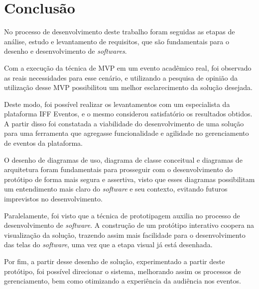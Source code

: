 \chapter{Conclusão}

No processo de desenvolvimento deste trabalho foram seguidas as etapas de análise, estudo e levantamento de requisitos, que são fundamentais para o desenho e desenvolvimento de \textit{softwares}.

Com a execução da técnica de MVP em um evento acadêmico real, foi observado as reais necessidades para esse cenário, e utilizando a pesquisa de opinião da utilização desse MVP possibilitou um melhor esclarecimento da solução desejada.

Deste modo, foi possível realizar os levantamentos com um especialista da plataforma IFF Eventos, e o mesmo considerou satisfatório os resultados obtidos. A partir disso foi constatada a viabilidade do desenvolvimento de uma solução para uma ferramenta que agregasse funcionalidade e agilidade no gerenciamento de eventos da plataforma.

O desenho de diagramas de uso, diagrama de classe conceitual e diagramas de arquitetura foram fundamentais para prosseguir com o desenvolvimento do protótipo de forma mais segura e assertiva, visto que esses diagramas possibilitam um entendimento mais claro do \textit{software} e seu contexto, evitando futuros imprevistos no desenvolvimento.

Paralelamente, foi visto que a técnica de prototipagem auxilia no processo de desenvolvimento de \textit{software}. A construção de um protótipo interativo coopera na visualização da solução, trazendo assim mais facilidade para o desenvolvimento das telas do \textit{software}, uma vez que a etapa visual já está desenhada. 

Por fim, a partir desse desenho de solução, experimentado a partir deste protótipo, foi possível direcionar o sistema, melhorando assim os processos de gerenciamento, bem como otimizando a experiência da audiência nos eventos.
